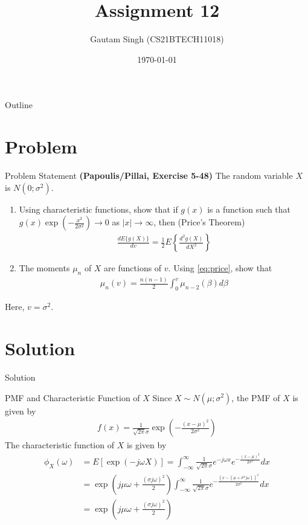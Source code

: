 \documentclass{beamer}
\title{Assignment 12}
\author{Gautam Singh (CS21BTECH11018)}
\date{\today}
\begin{document}
\begin{frame}
    \titlepage 
\end{frame}

\begin{frame}{Outline}
    \tableofcontents
\end{frame}

\section{Problem}
\begin{frame}{Problem Statement}
	\textbf{(Papoulis/Pillai, Exercise 5-48)} The random variable $X$ is $N(0; \sigma^2)$.
	\begin{enumerate}
		\item Using characteristic functions, show that if $g(x)$ is a function such that $g(x)\exp{(-\frac{x^2}{2\sigma^2})} \to 0$ as $|x| \to \infty$, then (Price's Theorem)
			\begin{align}
				\frac{dE\{g(X)\}}{dv} = \frac{1}{2}E\left\{\frac{d^2g(X)}{dX^2}\right\}
				\label{eq:price}
			\end{align}
		\item The moments $\mu_n$ of $X$ are functions of $v$. Using \eqref{eq:price}, show that
			\begin{align}
				\mu_n(v) = \frac{n(n - 1)}{2}\int_{0}^{v}\mu_{n - 2}(\beta)d\beta
				\label{eq:moments}
			\end{align}
	\end{enumerate}
	Here, $v = \sigma^2$.
\end{frame}

\section{Solution}
\begin{frame}{Solution}
	\begin{alertblock}{PMF and Characteristic Function of $X$}
		Since $X \sim N(\mu; \sigma^2)$, the PMF of $X$ is given by
		\begin{align}
			f(x) = \frac{1}{\sqrt{2\pi}\sigma}\exp{(-\frac{(x - \mu)^2}{2\sigma^2})}
			\label{eq:gauss-pmf}
		\end{align}
		The characteristic function of $X$ is given by
		\begin{align}
			\phi_X(\omega) &= E[\exp{(-j\omega X)}] = \int_{-\infty}^{\infty}\frac{1}{\sqrt{2\pi}\sigma}e^{-j\omega x}e^{-\frac{(x - \mu)^2}{2\sigma^2}}dx \\
			&= \exp{(j\mu\omega + \frac{(\sigma j\omega)^2}{2})}\int_{-\infty}^{\infty}\frac{1}{\sqrt{2\pi}\sigma}e^{-\frac{(x - (\mu + \sigma^2 j\omega))^2}{2\sigma^2}}dx \\
			&= \exp{(j\mu\omega + \frac{(\sigma j\omega)^2}{2})}
			\label{eq:char}
		\end{align}
	\end{alertblock}
\end{frame}
			
\end{document}
